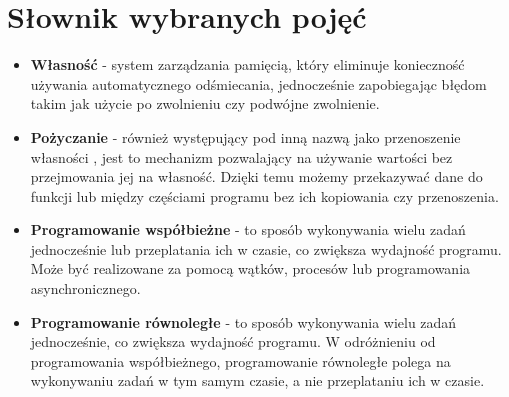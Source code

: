 \newpage
\section{Słownik wybranych pojęć}

\begin{itemize}
    \item \textbf{Własność } - system zarządzania pamięcią, który eliminuje konieczność używania automatycznego odśmiecania, jednocześnie zapobiegając błędom takim jak użycie po zwolnieniu czy podwójne zwolnienie.


    \item \textbf{Pożyczanie } - również występujący pod inną nazwą jako przenoszenie własności \cite{rustPolishNames}, jest to mechanizm pozwalający na używanie wartości bez przejmowania jej na własność. Dzięki temu możemy przekazywać dane do funkcji lub między częściami programu bez ich kopiowania czy przenoszenia.
    
    \item \textbf{Programowanie współbieżne} -  to sposób wykonywania wielu zadań jednocześnie lub przeplatania ich w czasie, co zwiększa wydajność programu. Może być realizowane za pomocą wątków, procesów lub programowania asynchronicznego.
    
    \item \textbf{Programowanie równoległe} - to sposób wykonywania wielu zadań jednocześnie, co zwiększa wydajność programu. W odróżnieniu od programowania współbieżnego, programowanie równoległe polega na wykonywaniu zadań w tym samym czasie, a nie przeplataniu ich w czasie.
\end{itemize}